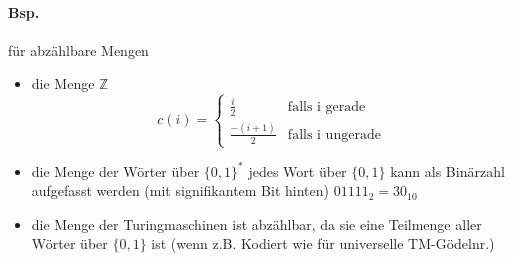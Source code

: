 \paragraph*{Bsp.} für abzählbare Mengen
\begin{itemize}
	\item die Menge $\mathbb{Z}$ $$ c(i)= \begin{cases}\frac{i}{2} & \text{falls i gerade}\\ \frac{-(i+1)}{2} & \text{falls i ungerade}\end{cases} $$ %
	\item die Menge der Wörter über $\{0,1\}^*$ jedes Wort über $\{0,1\}$ kann als Binärzahl aufgefasst werden (mit signifikantem Bit hinten) $01111_2=30_{10}$
	\item die Menge der Turingmaschinen ist abzählbar, da sie eine Teilmenge aller Wörter über $\{0,1\}$ ist (wenn z.B. Kodiert wie für universelle TM-Gödelnr.)
\end{itemize}
